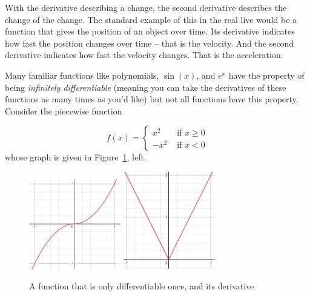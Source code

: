 With the derivative describing a change, the second derivative describes the
change of the change. The standard example of this in the real live would be
a function that gives the position of an object over time. Its derivative
indicates how fast the position changes over time -- that is the velocity.
And the second derivative indicates how fast the velocity changes. That is
the acceleration.

\begin{bsp}

Many familiar functions like polynomials, $\sin(x)$, and $e^x$ have the property
of being \textit{infinitely differentiable} (meaning you can take the
derivatives of these functions as many times as you'd like) but not all
functions have this property. Consider the piecewise function

\[
f(x) = \begin{cases}
x^2 & \text{ if }x \geq 0 \\
-x^2 & \text{ if }x < 0
\end{cases}\]
whose graph is given in Figure~\ref{tnex2figs}, left.

\begin{figure}
\begin{center}
\includegraphics[width=4cm]{pic/tnex2pic1.png}
\qquad
\includegraphics[width=4cm]{pic/tnex2pic2.png}
\end{center}
\caption{A function that is only differentiable once, and its derivative}
\label{tnex2figs}
\end{figure}


\end{bsp}
